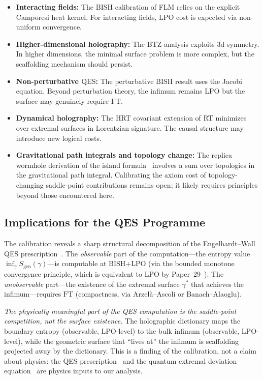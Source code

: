 \documentclass[11pt,a4paper]{article}
\theoremstyle{plain}
\theoremstyle{definition}
\newcommand{\LPO}{\ensuremath{\mathrm{LPO}}}
\newcommand{\BISH}{\ensuremath{\mathrm{BISH}}}
\newcommand{\FT}{\ensuremath{\mathrm{FT}}}
\newcommand{\QES}{\ensuremath{\mathrm{QES}}}
\begin{document}
\begin{itemize}[nosep]
\item \textbf{Interacting fields:}  The $\BISH$ calibration of
  FLM relies on the explicit Camporesi heat kernel.  For interacting
  fields, $\LPO$ cost is expected via non-uniform convergence.
\item \textbf{Higher-dimensional holography:}  The BTZ analysis
  exploits 3d symmetry.  In higher dimensions, the minimal surface
  problem is more complex, but the scaffolding mechanism should persist.
\item \textbf{Non-perturbative $\QES$:}  The perturbative $\BISH$
  result uses the Jacobi equation.  Beyond perturbation theory,
  the infimum remains $\LPO$ but the surface may genuinely require $\FT$.
\item \textbf{Dynamical holography:}  The HRT covariant extension
  of RT minimizes over extremal surfaces in Lorentzian signature.
  The causal structure may introduce new logical costs.
\item \textbf{Gravitational path integrals and topology change:}
  The replica wormhole derivation of the island formula~\cite{AHMST2020,PSSY2022}
  involves a sum over topologies in the gravitational path integral.
  Calibrating the axiom cost of topology-changing saddle-point contributions
  remains open; it likely requires principles beyond those encountered here.
\end{itemize}

\subsection{Implications for the QES Programme}

The calibration reveals a sharp structural decomposition of the
Engelhardt--Wall QES prescription~\cite{EW2015}.  The \emph{observable}
part of the computation---the entropy value $\inf_\gamma S_{\mathrm{gen}}(\gamma)$---is
computable at $\BISH$+$\LPO$ (via the bounded monotone convergence
principle, which is equivalent to $\LPO$ by Paper~29~\cite{Lee26P29}).
The \emph{unobservable} part---the existence of the extremal surface
$\gamma^*$ that achieves the infimum---requires $\FT$ (compactness,
via Arzel\`a--Ascoli or Banach--Alaoglu).

\emph{The physically meaningful part of the QES computation is the
saddle-point competition, not the surface existence.}
The holographic dictionary maps
the boundary entropy (observable, $\LPO$-level) to the bulk infimum
(observable, $\LPO$-level), while the geometric surface that ``lives
at'' the infimum is scaffolding projected away by the dictionary.
This is a finding of the calibration, not a claim about physics:
the QES prescription~\cite{EW2015} and the quantum extremal deviation
equation~\cite{EF2019} are physics inputs to our analysis.
\end{document}
